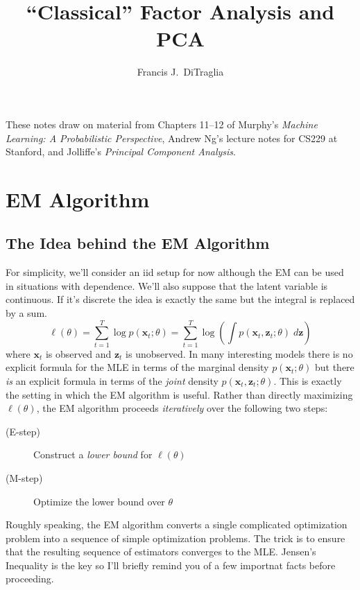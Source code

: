 \documentclass[12pt]{article}
\theoremstyle{definition}
\begin{document}
\title{``Classical'' Factor Analysis and PCA}

\author{Francis J.\ DiTraglia}

\maketitle 

\noindent 
These notes draw on material from Chapters 11--12 of Murphy's \emph{Machine Learning: A Probabilistic Perspective}, Andrew Ng's lecture notes for CS229 at Stanford, and Jolliffe's \emph{Principal Component Analysis}.

\section{EM Algorithm}


\subsection{The Idea behind the EM Algorithm}
For simplicity, we'll consider an iid setup for now although the EM can be used in situations with dependence. We'll also suppose that the latent variable is continuous. If it's discrete the idea is exactly the same but the integral is replaced by a sum.
	$$\ell(\theta) = \sum_{t=1}^T \log p(\textbf{x}_t;\theta) = \sum_{t=1}^T \log \left(\int p(\textbf{x}_t,	\textbf{z}_t;\theta)\; d \textbf{z} \right)$$
where $\mathbf{x}_t$ is observed and $\mathbf{z}_t$ is unobserved. In many interesting models there is no explicit formula for the MLE in terms of the marginal density $p(\mathbf{x}_t;\theta)$ but there \emph{is} an explicit formula in terms of the \emph{joint} density $p(\mathbf{x}_t,\mathbf{z}_t;\theta)$. This is exactly the setting in which the EM algorithm is useful. Rather than directly maximizing $\ell(\theta)$, the EM algorithm proceeds \emph{iteratively} over the following two steps:
	\begin{description}
		\item[(E-step)] Construct a \emph{lower bound} for $\ell(\theta)$
		\item[(M-step)] Optimize the lower bound over $\theta$
	\end{description}
Roughly speaking, the EM algorithm converts a single complicated optimization problem into a sequence of simple optimization problems. The trick is to ensure that the resulting sequence of estimators converges to the MLE. Jensen's Inequality is the key so I'll briefly remind you of a few importnat facts before proceeding. 
\end{document}
